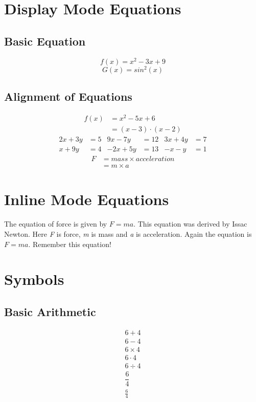 \documentclass[]{article}
\begin{document}
\section{Display Mode Equations}
\subsection{Basic Equation}

\[f(x)=x^2-3x+9\]
\[G(x)=sin^2(x)\]   


\subsection{Alignment of Equations}
\begin{align}
    \nonumber
    f(x) & = x^2-5x+6\\
    & = (x-3)\cdot(x-2)
\end{align}
\begin{align*}
    2x+3y & = 5 & 9x-7y & = 12 & 3x+4y & = 7 \\
    x+9y & = 4  & -2x+5y & = 13 & -x-y & = 1
\end{align*}
\begin{align}
    \nonumber
    F & = mass \times acceleration\\
    & = m \times a
\end{align}
\section{Inline Mode Equations}
The equation of force is given by $F=ma$. This equation was derived by Issac Newton. Here \textit{F} is force, \textit{m} is mass and \textit{a} is acceleration. Again the equation is \(F=ma\). Remember this equation!
\section{Symbols}
\subsection{Basic Arithmetic}

\begin{align*}
6+4\\
6-4\\
6 \times 4\\
6 \cdot 4\\
6 \div 4\\
\dfrac{6}{4}\\
\tfrac{6}{4}
\end{align*}
\newpage
\end{document}

